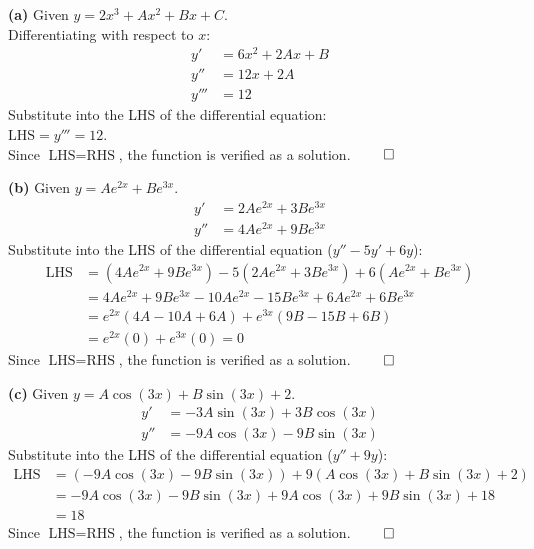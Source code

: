 \begin{solution}
\textbf{(a)} Given $y = 2x^3 + Ax^2 + Bx + C$. \\
Differentiating with respect to $x$:
\begin{align*}
    y' &= 6x^2 + 2Ax + B \\
    y'' &= 12x + 2A \\
    y''' &= 12
\end{align*}
Substitute into the LHS of the differential equation: \\
$\text{LHS} = y''' = 12$. \\
Since $\text{LHS} = \text{RHS}$, the function is verified as a solution. $\qed$

\vspace{0.3cm}

\textbf{(b)} Given $y = Ae^{2x} + Be^{3x}$. 
\begin{align*}
    y' &= 2Ae^{2x} + 3Be^{3x} \\
    y'' &= 4Ae^{2x} + 9Be^{3x}
\end{align*}
Substitute into the LHS of the differential equation ($y'' - 5y' + 6y$):
\begin{align*}
    \text{LHS} &= (4Ae^{2x} + 9Be^{3x}) - 5(2Ae^{2x} + 3Be^{3x}) + 6(Ae^{2x} + Be^{3x}) \\
    &= 4Ae^{2x} + 9Be^{3x} - 10Ae^{2x} - 15Be^{3x} + 6Ae^{2x} + 6Be^{3x} \\
    &= e^{2x}(4A - 10A + 6A) + e^{3x}(9B - 15B + 6B) \\
    &= e^{2x}(0) + e^{3x}(0) = 0
\end{align*}
Since $\text{LHS} = \text{RHS}$, the function is verified as a solution. $\qed$

\vspace{0.3cm}

\textbf{(c)} Given $y = A\cos(3x) + B\sin(3x) + 2$.
\begin{align*}
    y' &= -3A\sin(3x) + 3B\cos(3x) \\
    y'' &= -9A\cos(3x) - 9B\sin(3x)
\end{align*}
Substitute into the LHS of the differential equation ($y'' + 9y$):
\begin{align*}
    \text{LHS} &= (-9A\cos(3x) - 9B\sin(3x)) + 9(A\cos(3x) + B\sin(3x) + 2) \\
    &= -9A\cos(3x) - 9B\sin(3x) + 9A\cos(3x) + 9B\sin(3x) + 18 \\
    &= 18
\end{align*}
Since $\text{LHS} = \text{RHS}$, the function is verified as a solution. $\qed$


\end{solution}
